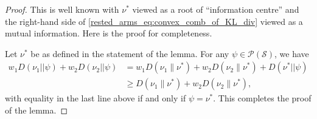  \begin{proof}
 This is well known with $\nu^*$ viewed as a root of ``information centre'' and the right-hand side of \eqref{rested_arms_eq:convex_comb_of_KL_div} viewed as a mutual information. Here is the proof for completeness.

  Let $\nu^*$ be as defined in the statement of the lemma. For any $\psi\in\mathcal{P}(\mathcal{S})$, we have
{\color{black}
 \begingroup\allowdisplaybreaks\begin{align}
 w_1 D(\nu_1||\psi)+w_2 D(\nu_2||\psi)
 &=w_1D(\nu_1\|\nu^*)+w_2 D(\nu_2\| \nu^*)+D(\nu^*||\psi)\nonumber\\
 &\geq D(\nu_1\|\nu^*)+w_2 D(\nu_2\| \nu^*),\label{rested_arms_eq:conv_comb_of_KL_div_proof}
 \end{align}\endgroup}
 with equality in the last line above if and only if $\psi=\nu^*$. This completes the proof of the lemma.	
 \end{proof}

